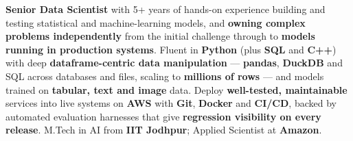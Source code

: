 \documentclass[letter,10pt]{article}
\begin{document}
%

\textbf{Senior Data Scientist} with 5+ years of hands-on experience building and testing statistical and machine-learning models, and \textbf{owning complex problems independently} from the initial challenge through to \textbf{models running in production systems}.
Fluent in \textbf{Python} (plus \textbf{SQL} and \textbf{C++}) with deep \textbf{dataframe-centric data manipulation} --- \textbf{pandas}, \textbf{DuckDB} and SQL across databases and files, scaling to \textbf{millions of rows} --- and models trained on \textbf{tabular, text and image} data.
Deploy \textbf{well-tested, maintainable} services into live systems on \textbf{AWS} with \textbf{Git}, \textbf{Docker} and \textbf{CI/CD}, backed by automated evaluation harnesses that give \textbf{regression visibility on every release}.
M.Tech in AI from \textbf{IIT Jodhpur}; Applied Scientist at \textbf{Amazon}.
\end{document}
